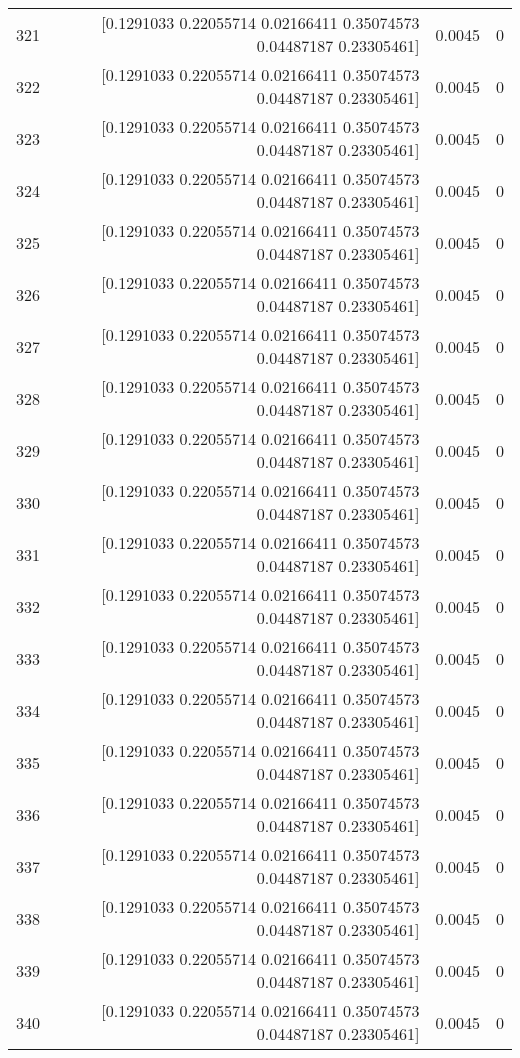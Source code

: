 \begin{longtable}{lrrr}
321 & [0.1291033  0.22055714 0.02166411 0.35074573 0.04487187 0.23305461] & 0.0045 & 0 \\
322 & [0.1291033  0.22055714 0.02166411 0.35074573 0.04487187 0.23305461] & 0.0045 & 0 \\
323 & [0.1291033  0.22055714 0.02166411 0.35074573 0.04487187 0.23305461] & 0.0045 & 0 \\
324 & [0.1291033  0.22055714 0.02166411 0.35074573 0.04487187 0.23305461] & 0.0045 & 0 \\
325 & [0.1291033  0.22055714 0.02166411 0.35074573 0.04487187 0.23305461] & 0.0045 & 0 \\
326 & [0.1291033  0.22055714 0.02166411 0.35074573 0.04487187 0.23305461] & 0.0045 & 0 \\
327 & [0.1291033  0.22055714 0.02166411 0.35074573 0.04487187 0.23305461] & 0.0045 & 0 \\
328 & [0.1291033  0.22055714 0.02166411 0.35074573 0.04487187 0.23305461] & 0.0045 & 0 \\
329 & [0.1291033  0.22055714 0.02166411 0.35074573 0.04487187 0.23305461] & 0.0045 & 0 \\
330 & [0.1291033  0.22055714 0.02166411 0.35074573 0.04487187 0.23305461] & 0.0045 & 0 \\
331 & [0.1291033  0.22055714 0.02166411 0.35074573 0.04487187 0.23305461] & 0.0045 & 0 \\
332 & [0.1291033  0.22055714 0.02166411 0.35074573 0.04487187 0.23305461] & 0.0045 & 0 \\
333 & [0.1291033  0.22055714 0.02166411 0.35074573 0.04487187 0.23305461] & 0.0045 & 0 \\
334 & [0.1291033  0.22055714 0.02166411 0.35074573 0.04487187 0.23305461] & 0.0045 & 0 \\
335 & [0.1291033  0.22055714 0.02166411 0.35074573 0.04487187 0.23305461] & 0.0045 & 0 \\
336 & [0.1291033  0.22055714 0.02166411 0.35074573 0.04487187 0.23305461] & 0.0045 & 0 \\
337 & [0.1291033  0.22055714 0.02166411 0.35074573 0.04487187 0.23305461] & 0.0045 & 0 \\
338 & [0.1291033  0.22055714 0.02166411 0.35074573 0.04487187 0.23305461] & 0.0045 & 0 \\
339 & [0.1291033  0.22055714 0.02166411 0.35074573 0.04487187 0.23305461] & 0.0045 & 0 \\
340 & [0.1291033  0.22055714 0.02166411 0.35074573 0.04487187 0.23305461] & 0.0045 & 0 \\

\end{longtable}
